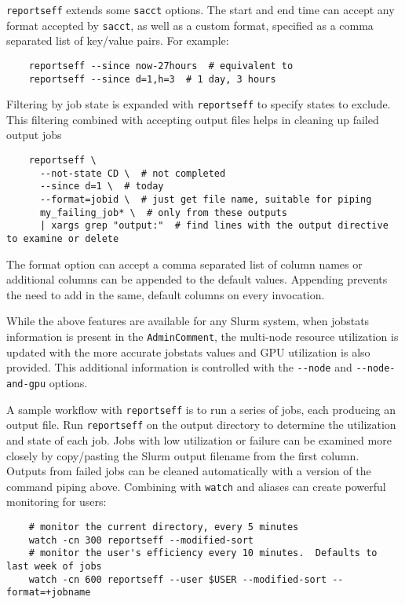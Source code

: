 \texttt{reportseff} extends some \texttt{sacct} options.  The start and end time can accept any format accepted by \texttt{sacct}, as well as a custom format, specified as a comma separated list of key/value pairs.  For example:
\begin{verbatim}
    reportseff --since now-27hours  # equivalent to
    reportseff --since d=1,h=3  # 1 day, 3 hours
\end{verbatim}
Filtering by job state is expanded with \texttt{reportseff} to specify states to exclude.  This filtering combined with accepting output files helps in cleaning up failed output jobs
\begin{verbatim}
    reportseff \
      --not-state CD \  # not completed
      --since d=1 \  # today
      --format=jobid \  # just get file name, suitable for piping
      my_failing_job* \  # only from these outputs
      | xargs grep "output:"  # find lines with the output directive to examine or delete
\end{verbatim}
The format option can accept a comma separated list of column names or additional columns can be appended to the default values.  Appending prevents the need to add in the same, default columns on every invocation.

While the above features are available for any Slurm system, when jobstats information is present in the \texttt{AdminComment}, the multi-node resource utilization is updated with the more accurate jobstats values and GPU utilization is also provided.  This additional information is controlled with the \texttt{-{}-node} and \texttt{-{}-node-and-gpu} options.

A sample workflow with \texttt{reportseff} is to run a series of jobs, each producing an output file.  Run \texttt{reportseff} on the output directory to determine the utilization and state of each job.  Jobs with low utilization or failure can be examined more closely by copy/pasting the Slurm output filename from the first column.  Outputs from failed jobs can be cleaned automatically with a version of the command piping above. Combining with \texttt{watch} and aliases can create powerful monitoring for users:
\begin{verbatim}
    # monitor the current directory, every 5 minutes
    watch -cn 300 reportseff --modified-sort
    # monitor the user's efficiency every 10 minutes.  Defaults to last week of jobs
    watch -cn 600 reportseff --user $USER --modified-sort --format=+jobname
\end{verbatim}

